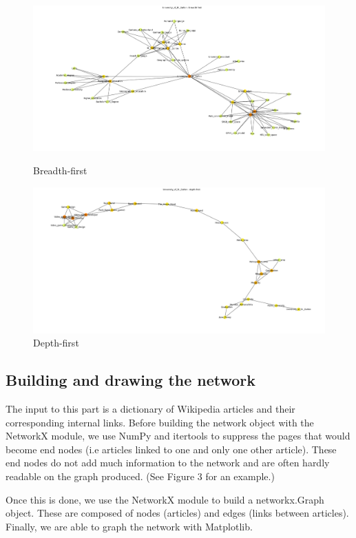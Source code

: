 \documentclass[10pt]{article}
\begin{document}
		\begin{figure}	
			\includegraphics[width=\textwidth]{figure1.png}
    			 	\centering
    			 	\caption{Breadth-first}
\par\par			
			\includegraphics[width=\textwidth]{figure2.png}
   			  	\centering
  			  	\caption{Depth-first}
		\end{figure}
	
	
	\subsection{Building and drawing the network}
	The input to this part is a dictionary of Wikipedia articles and their corresponding internal links. Before building the network object with the NetworkX module, we use NumPy and 	itertools to suppress the pages that would become end nodes (i.e articles linked to one and only one other article). These end nodes do not add much information to the network 	and are often hardly readable on the graph produced. (See Figure 3 for an example.)
	\par \noindent
	Once this is done, we use the NetworkX module to build a networkx.Graph object. These are composed of nodes (articles) and edges (links between articles). Finally, we are able 	to graph the network with Matplotlib.\par \noindent
	
\end{document}
